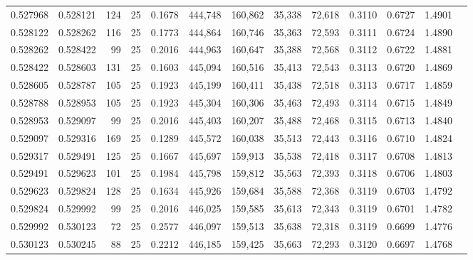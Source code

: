 \begin{tabular}{rrrrrrrrrrrrr}
0.527968 & 0.528121 &   124 &  25 &                                     0.1678 & 444,748 & 160,862 &  35,338 &  72,618 & 0.3110 & 0.6727 & 1.4901 \\
0.528122 & 0.528262 &   116 &  25 &                                     0.1773 & 444,864 & 160,746 &  35,363 &  72,593 & 0.3111 & 0.6724 & 1.4890 \\
0.528262 & 0.528422 &    99 &  25 &                                     0.2016 & 444,963 & 160,647 &  35,388 &  72,568 & 0.3112 & 0.6722 & 1.4881 \\
0.528422 & 0.528603 &   131 &  25 &                                     0.1603 & 445,094 & 160,516 &  35,413 &  72,543 & 0.3113 & 0.6720 & 1.4869 \\
0.528605 & 0.528787 &   105 &  25 &                                     0.1923 & 445,199 & 160,411 &  35,438 &  72,518 & 0.3113 & 0.6717 & 1.4859 \\
0.528788 & 0.528953 &   105 &  25 &                                     0.1923 & 445,304 & 160,306 &  35,463 &  72,493 & 0.3114 & 0.6715 & 1.4849 \\
0.528953 & 0.529097 &    99 &  25 &                                     0.2016 & 445,403 & 160,207 &  35,488 &  72,468 & 0.3115 & 0.6713 & 1.4840 \\
0.529097 & 0.529316 &   169 &  25 &                                     0.1289 & 445,572 & 160,038 &  35,513 &  72,443 & 0.3116 & 0.6710 & 1.4824 \\
0.529317 & 0.529491 &   125 &  25 &                                     0.1667 & 445,697 & 159,913 &  35,538 &  72,418 & 0.3117 & 0.6708 & 1.4813 \\
0.529491 & 0.529623 &   101 &  25 &                                     0.1984 & 445,798 & 159,812 &  35,563 &  72,393 & 0.3118 & 0.6706 & 1.4803 \\
0.529623 & 0.529824 &   128 &  25 &                                     0.1634 & 445,926 & 159,684 &  35,588 &  72,368 & 0.3119 & 0.6703 & 1.4792 \\
0.529824 & 0.529992 &    99 &  25 &                                     0.2016 & 446,025 & 159,585 &  35,613 &  72,343 & 0.3119 & 0.6701 & 1.4782 \\
0.529992 & 0.530123 &    72 &  25 &                                     0.2577 & 446,097 & 159,513 &  35,638 &  72,318 & 0.3119 & 0.6699 & 1.4776 \\
0.530123 & 0.530245 &    88 &  25 &                                     0.2212 & 446,185 & 159,425 &  35,663 &  72,293 & 0.3120 & 0.6697 & 1.4768 \\

\end{tabular}
